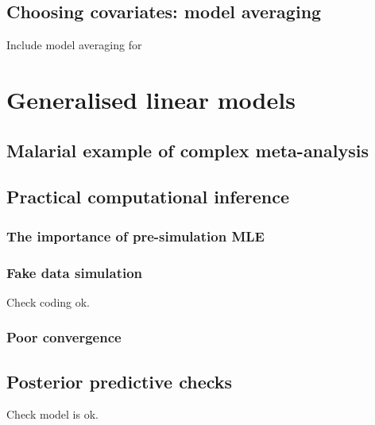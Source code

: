 \documentclass[11pt,fullpage]{book}
\begin{document}
\section{Choosing covariates: model averaging}\label{sec:Regression_modelAveraging}
Include model averaging for 

\chapter{Generalised linear models}
\section{Malarial example of complex meta-analysis}
\section{Practical computational inference}
\subsection{The importance of pre-simulation MLE}\label{sec:GLM_preSimMLE}
\subsection{Fake data simulation}
Check coding ok.
\subsection{Poor convergence}\label{sec:GLM_poorConvergence}
\section{Posterior predictive checks}
Check model is ok.






\printindex
\end{document}
